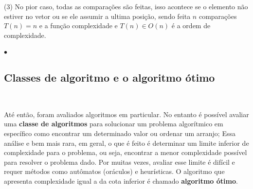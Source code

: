 (3) No pior caso, todas as comparações são feitas, isso acontece se o elemento não estiver no vetor ou se ele assumir a ultima posição, sendo feita $n$ comparações $T(n)=n$ e a função complexidade e $T(n) \in O(n)$ é a ordem de complexidade.

{\raggedleft $\bullet$ \par}

\subsection{Classes de algoritmo e o algoritmo ótimo}
\

Até então, foram avaliados algoritmos em particular. No entanto é possível avaliar uma \textbf{classe de algoritmos} para solucionar um problema algorítmico em específico como encontrar um determinado valor ou ordenar um arranjo; Essa análise e bem mais rara, em geral, o que é feito é determinar um limite inferior de complexidade para o problema, ou seja, encontrar a menor complexidade possível para resolver o problema dado. Por muitas vezes, avaliar esse limite é difícil e requer métodos como autômatos (oráculos) e heurísticas. O algoritmo que apresenta complexidade igual a da cota inferior é chamado \textbf{algoritmo ótimo}.